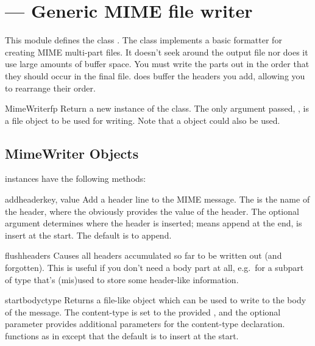 \section{ ---
         Generic MIME file writer}



This module defines the class .  The
 class implements a basic formatter for creating
MIME multi-part files.  It doesn't seek around the output file nor
does it use large amounts of buffer space. You must write the parts
out in the order that they should occur in the final
file.  does buffer the headers you add, allowing you 
to rearrange their order.

\begin{classdesc}{MimeWriter}{fp}
Return a new instance of the  class.  The only
argument passed, , is a file object to be used for
writing. Note that a  object could also be used.
\end{classdesc}


\subsection{MimeWriter Objects \label{MimeWriter-objects}}


 instances have the following methods:

\begin{methoddesc}{addheader}{key, value}
Add a header line to the MIME message. The  is the name of
the header, where the  obviously provides the value of the
header. The optional argument  determines where the header 
is inserted;  means append at the end,  is insert at
the start. The default is to append.
\end{methoddesc}

\begin{methoddesc}{flushheaders}{}
Causes all headers accumulated so far to be written out (and
forgotten). This is useful if you don't need a body part at all,
e.g.\ for a subpart of type  that's (mis)used
to store some header-like information.
\end{methoddesc}

\begin{methoddesc}{startbody}{ctype}
Returns a file-like object which can be used to write to the
body of the message.  The content-type is set to the provided
, and the optional parameter  provides
additional parameters for the content-type declaration. 
functions as in  except that the default is to
insert at the start.
\end{methoddesc}

